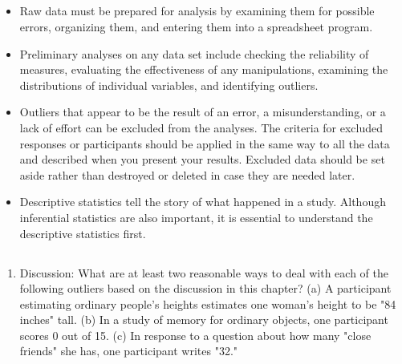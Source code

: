 \subsection{}
\begin{fullwidth}
\begin{itemize}
\item Raw data must be prepared for analysis by examining them for possible errors, organizing them, and entering them into a spreadsheet program.
\item Preliminary analyses on any data set include checking the reliability of measures, evaluating the effectiveness of any manipulations, examining the distributions of individual variables, and identifying outliers.
\item Outliers that appear to be the result of an error, a misunderstanding, or a lack of effort can be excluded from the analyses. The criteria for excluded responses or participants should be applied in the same way to all the data and described when you present your results. Excluded data should be set aside rather than destroyed or deleted in case they are needed later.
\item Descriptive statistics tell the story of what happened in a study. Although inferential statistics are also important, it is essential to understand the descriptive statistics first.
\end{itemize}
\end{fullwidth}

 

\subsection{}
\begin{fullwidth}
\begin{enumerate}
\item Discussion: What are at least two reasonable ways to deal with each of the following outliers based on the discussion in this chapter? (a) A participant estimating ordinary people's heights estimates one woman's height to be "84 inches" tall. (b) In a study of memory for ordinary objects, one participant scores 0 out of 15. (c) In response to a question about how many "close friends" she has, one participant writes "32." 
\end{enumerate}
\end{fullwidth}  

